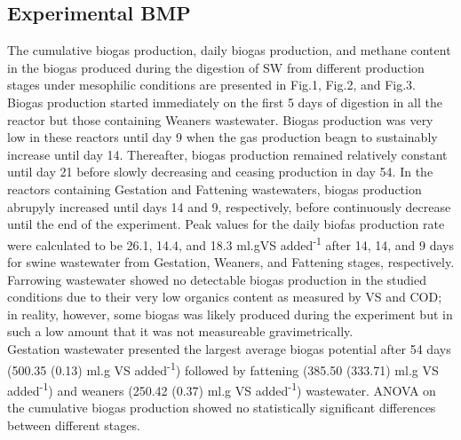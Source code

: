 \subsection{Experimental BMP}
The cumulative biogas production, daily biogas production, and methane content in the biogas produced during the digestion of SW from different production stages under mesophilic conditions are presented in Fig.1, Fig.2, and Fig.3.\\
Biogas production started immediately on the first 5 days of digestion in all the reactor but those containing Weaners wastewater. Biogas production was very low in these reactors until day 9 when the gas production beagn to sustainably increase until day 14. Thereafter, biogas production remained relatively constant until day 21 before slowly decreasing and ceasing production in day 54. In the reactors containing Gestation and Fattening wastewaters, biogas production abrupyly increased until days 14 and 9, respectively, before continuously decrease until the end of the experiment. Peak values for the daily biofas production rate were calculated to be 26.1, 14.4, and 18.3 ml.gVS added\textsuperscript{-1} after 14, 14, and 9 days for swine wastewater from Gestation, Weaners, and Fattening stages, respectively.
Farrowing wastewater showed no detectable biogas production in the studied conditions due to their very low organics content as measured by VS and COD; in reality, however, some biogas was likely produced during the experiment but in such a low amount that it was not measureable gravimetrically.\\
Gestation wastewater presented the largest average biogas potential after 54 days (500.35 (0.13) ml.g VS added\textsuperscript{-1}) followed by fattening (385.50 (333.71) ml.g VS added\textsuperscript{-1}) and weaners (250.42 (0.37) ml.g VS added\textsuperscript{-1}) wastewater. ANOVA on the cumulative biogas production showed no statistically significant differences between different stages.\\
